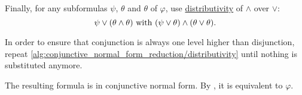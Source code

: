 \begin{algorithm}
\begin{AlgEnum}
     Finally, for any subformulas \( \psi \), \( \theta \) and \( \theta \) of \( \varphi \), use \hyperref[eq:def:distributive_lattice/distributivity]{distributivity} of \( \wedge \) over \( \vee \):
    \begin{equation*}
      \psi \vee (\theta \wedge \theta) \text{ with } (\psi \vee \theta) \wedge (\theta \vee \theta).
    \end{equation*}

    In order to ensure that conjunction is always one level higher than disjunction, repeat \ref{alg:conjunctive_normal_form_reduction/distributivity} until nothing is substituted anymore.
  \end{AlgEnum}

  The resulting formula is in conjunctive normal form. By , it is equivalent to \( \varphi \).
\end{algorithm}
